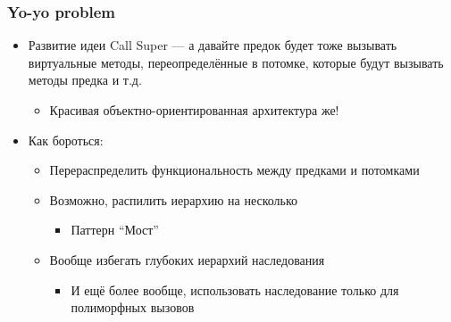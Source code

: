 \documentclass{../../slides-style}
\begin{document}
    \begin{frame}
        \frametitle{Yo-yo problem}
        \begin{itemize}
            \item Развитие идеи Call Super --- а давайте предок будет тоже вызывать виртуальные методы, переопределённые в потомке, которые будут вызывать методы предка и т.д.
            \begin{itemize}
                \item Красивая объектно-ориентированная архитектура же!
            \end{itemize}
            \item Как бороться:
            \begin{itemize}
                \item Перераспределить функциональность между предками и потомками
                \item Возможно, распилить иерархию на несколько
                \begin{itemize}
                    \item Паттерн ``Мост''
                \end{itemize}
                \item Вообще избегать глубоких иерархий наследования
                \begin{itemize}
                    \item И ещё более вообще, использовать наследование только для полиморфных вызовов
                \end{itemize}
            \end{itemize}
        \end{itemize}
    \end{frame}
\end{document}
